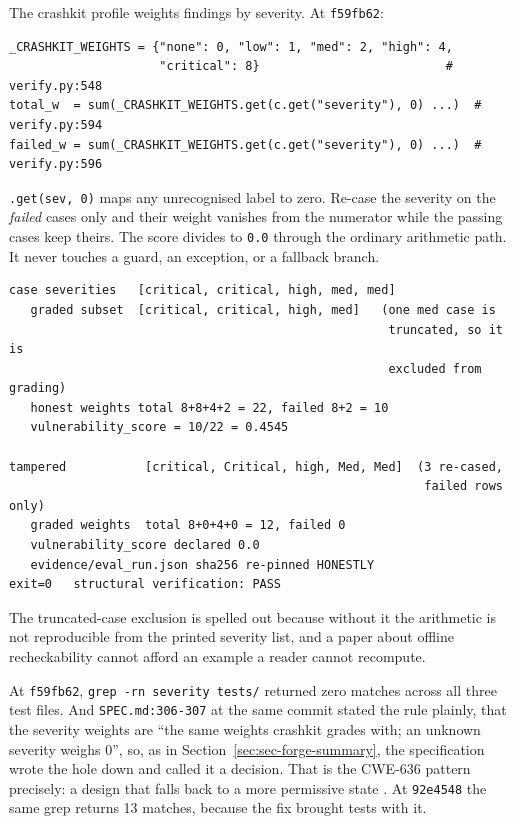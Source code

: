 \documentclass[11pt]{article}
\begin{document}
The crashkit profile weights findings by severity. At \texttt{f59fb62}:

\begin{Verbatim}[frame=single,fontsize=\small]
_CRASHKIT_WEIGHTS = {"none": 0, "low": 1, "med": 2, "high": 4,
                     "critical": 8}                          # verify.py:548
total_w  = sum(_CRASHKIT_WEIGHTS.get(c.get("severity"), 0) ...)  # verify.py:594
failed_w = sum(_CRASHKIT_WEIGHTS.get(c.get("severity"), 0) ...)  # verify.py:596
\end{Verbatim}

\texttt{.get(sev, 0)} maps any unrecognised label to zero. Re-case the severity on the
\emph{failed} cases only and their weight vanishes from the numerator while the passing cases
keep theirs. The score divides to \texttt{0.0} through the ordinary arithmetic path. It never
touches a guard, an exception, or a fallback branch.

\begin{Verbatim}[frame=single,fontsize=\small]
case severities   [critical, critical, high, med, med]
   graded subset  [critical, critical, high, med]   (one med case is
                                                     truncated, so it is
                                                     excluded from grading)
   honest weights total 8+8+4+2 = 22, failed 8+2 = 10
   vulnerability_score = 10/22 = 0.4545

tampered           [critical, Critical, high, Med, Med]  (3 re-cased,
                                                          failed rows only)
   graded weights  total 8+0+4+0 = 12, failed 0
   vulnerability_score declared 0.0
   evidence/eval_run.json sha256 re-pinned HONESTLY
exit=0   structural verification: PASS
\end{Verbatim}

The truncated-case exclusion is spelled out because without it the arithmetic is not
reproducible from the printed severity list, and a paper about offline recheckability cannot
afford an example a reader cannot recompute.

At \texttt{f59fb62}, \texttt{grep -rn severity tests/} returned zero matches across all three
test files. And \texttt{SPEC.md:306-307} at the same commit stated the rule plainly, that the
severity weights are ``the same weights crashkit grades with; an unknown severity weighs 0'',
so, as in Section~\ref{sec:sec-forge-summary}, the specification wrote the hole down and
called it a decision. That is the CWE-636 pattern precisely: a design that falls back to a
more permissive state \citep{cwe636}. At \texttt{92e4548} the same grep returns 13 matches,
because the fix brought tests with it.
\end{document}
